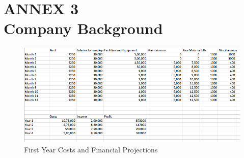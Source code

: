 \documentclass[11pt]{article}
\begin{document}
\section{ANNEX 3 \\ Company Background}

\begin{figure}[h!]
	\caption{First Year Costs and Financial Projections}
	\centering
	\includegraphics[width=\textwidth]{costs.png}
	\end{figure}
\newpage
\end{document}
